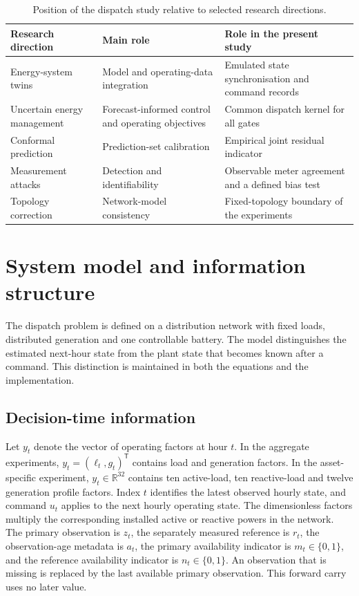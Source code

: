 \documentclass[preprint,12pt]{elsarticle}
\newcommand{\R}{\mathbb{R}}
\begin{document}
\begin{table}[t]
\centering\small
\caption{Position of the dispatch study relative to selected research directions.}\label{tab:position}
\begin{tabular}{>{\raggedright\arraybackslash}p{.23\linewidth}>{\raggedright\arraybackslash}p{.30\linewidth}>{\raggedright\arraybackslash}p{.37\linewidth}}
\toprule
Research direction & Main role & Role in the present study\\
\midrule
Energy-system twins \cite{ardebili,hueros,zhang} & Model and operating-data integration & Emulated state synchronisation and command records\\
Uncertain energy management \cite{panda,rahman,li} & Forecast-informed control and operating objectives & Common dispatch kernel for all gates\\
Conformal prediction \cite{angelopoulos,oliveira,gibbs} & Prediction-set calibration & Empirical joint residual indicator\\
Measurement attacks \cite{liu,pasqualetti} & Detection and identifiability & Observable meter agreement and a defined bias test\\
Topology correction \cite{dongliu} & Network-model consistency & Fixed-topology boundary of the experiments\\
\bottomrule
\end{tabular}
\end{table}

\section{System model and information structure}\label{sec:model}
The dispatch problem is defined on a distribution network with fixed loads, distributed generation and one controllable battery. The model distinguishes the estimated next-hour state from the plant state that becomes known after a command. This distinction is maintained in both the equations and the implementation.

\subsection{Decision-time information}
Let $y_t$ denote the vector of operating factors at hour $t$. In the aggregate experiments, $y_t=(\ell_t,g_t)^{\mathsf T}$ contains load and generation factors. In the asset-specific experiment, $y_t\in\R^{32}$ contains ten active-load, ten reactive-load and twelve generation profile factors. Index $t$ identifies the latest observed hourly state, and command $u_t$ applies to the next hourly operating state. The dimensionless factors multiply the corresponding installed active or reactive powers in the network. The primary observation is $z_t$, the separately measured reference is $r_t$, the observation-age metadata is $a_t$, the primary availability indicator is $m_t\in\{0,1\}$, and the reference availability indicator is $n_t\in\{0,1\}$. An observation that is missing is replaced by the last available primary observation. This forward carry uses no later value.
\end{document}
